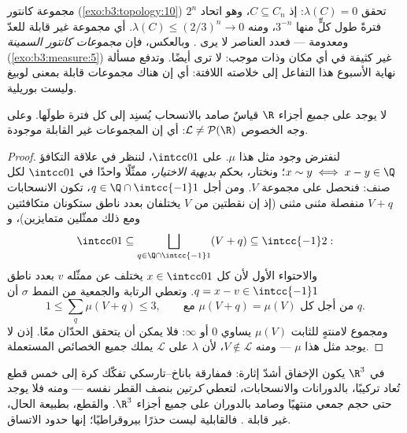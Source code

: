 \begin{example}\label{ex:b3:measure:cantor}
مجموعة كانتور (\cref{exo:b3:topology:10}) تحقق $\lambda(C) = 0$: إذ $C \subseteq C_n$،
وهو اتحاد $2^n$ فترةً طول كلٍّ منها $3^{-n}$، ومنه $\lambda(C) \leq (2/3)^n \to 0$. أي
مجموعة غير قابلة للعدّ ومعدومة  --- فعدد العناصر لا يرى .
وبالعكس، فإن \emph{مجموعات كانتور السمينة} (\cref{exo:b3:measure:5}) غير
كثيفة في أي مكان وذات  موجب:  لا ترى 
أيضًا. وتدفع مسألة نهاية الأسبوع هذا التفاعل إلى خلاصته
اللافتة: أي إن هناك مجموعات قابلة  بمعنى لوبيغ وليست
بوريلية.
\end{example}

\begin{theorem}[فيتالي]\label{thm:b3:measure:vitali}
لا يوجد على \emph{جميع} أجزاء $\R$ قياسٌ صامد بالانسحاب يُسنِد
إلى كل فترة طولَها. وعلى وجه الخصوص $\mathcal L \neq \mathcal P(\R)$: أي إن المجموعات غير
القابلة  موجودة.
\end{theorem}

\begin{proof}
لنفترض وجود مثل هذا $\mu$. على $\intcc01$، لننظر في علاقة
التكافؤ $x \sim y \iff x - y \in \Q$؛ ونختار، بحكم \emph{بديهية الاختيار}، ممثّلًا واحدًا
في $\intcc01$ لكل صنف: فنحصل على مجموعة $V$. ومن أجل $q \in \Q\cap\intcc{-1}1$،
تكون الانسحابات $V + q$ منفصلة مثنى مثنى (إذ إن نقطتين من $V$
يختلفان بعدد ناطق ستكونان متكافئتين ومع ذلك ممثّلين متمايزين)،
و
\[
\intcc01 \subseteq \bigsqcup_{q \in \Q\cap\intcc{-1}1}(V + q)
\subseteq \intcc{-1}2 :
\]
والاحتواء الأول لأن كل $x \in \intcc01$ يختلف عن ممثّله $v$
بعدد ناطق $q = x - v \in
\intcc{-1}1$. وتعطي الرتابة والجمعية من النمط $\sigma$ أن
\[
1 \leq \sum_{q}\mu(V + q) \leq 3,
\qquad\text{مع } \mu(V + q) = \mu(V) \text{ من أجل كل } q .
\]
ومجموع لامنتهٍ للثابت $\mu(V)$ يساوي $0$ أو $\infty$: فلا يمكن
أن يتحقق الحدّان معًا. إذن لا يوجد مثل هذا $\mu$ --- ومنه
$V
\notin \mathcal L$، لأن $\lambda$ على $\mathcal L$ يملك جميع الخصائص
المستعملة.
\end{proof}

\begin{remark}\label{rem:b3:measure:banachtarski}
في $\R^3$ يكون الإخفاق أشدّ إثارة: فمفارقة باناخ--تارسكي تفكّك
كرة إلى خمس قطع تُعاد تركيبًا، بالدورانات والانسحابات، لتعطي
\emph{كرتين} بنصف القطر نفسه --- ومنه فلا يوجد حتى حجم جمعي
منتهيًا وصامد بالدوران على جميع أجزاء $\R^3$. والقطع، بطبيعة
الحال، غير قابلة . فالقابلية  ليست حذرًا بيروقراطيًا؛
إنها حدود الاتساق.
\end{remark}

